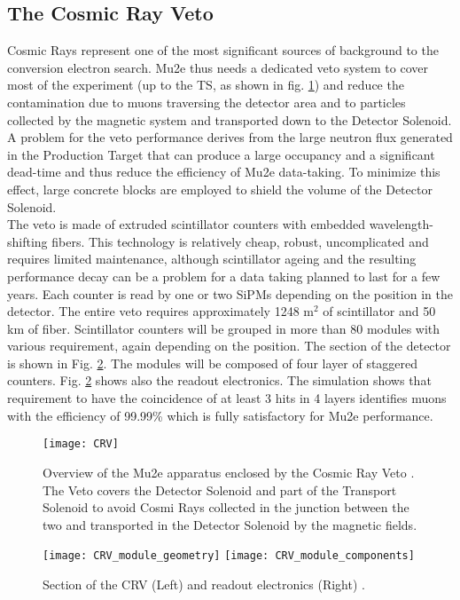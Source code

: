 \documentclass[12pt,a4paper,openright, oneside, titlepage]{book} %
\begin{document}
\subsection{The Cosmic Ray Veto}
Cosmic Rays represent one of the most significant sources of background to the conversion electron search.
Mu2e thus needs a dedicated veto system \cite{CRV:2019} to cover most of the experiment 
(up to the TS, as shown in fig. \ref{_CRV}) and reduce the contamination due to muons traversing the detector area 
and to particles collected by the magnetic system and transported down to the Detector Solenoid. 
A problem for the veto performance derives from the large neutron flux generated 
in the Production Target that can produce a large occupancy and a significant dead-time and thus reduce the efficiency
of Mu2e data-taking. To minimize this effect, large concrete blocks are employed to shield the volume of the Detector Solenoid.\\
The veto is made of extruded scintillator counters with embedded wavelength-shifting fibers.
This technology is relatively cheap, robust, uncomplicated and requires limited maintenance, 
although scintillator ageing and the resulting performance decay can be a problem for a
data taking planned to last for a few years.
Each counter is read by one or two SiPMs depending on the position in the detector. 
The entire veto requires approximately 1248 m$^2$ of scintillator and 50 km of fiber. 
Scintillator counters will be grouped in more than 80 modules with various requirement, 
again depending on the position.
The section of the detector is shown in Fig. \ref{_CRV_module_geometry}.
The modules will be composed of four layer of staggered counters. 
Fig. \ref{_CRV_module_geometry} shows also the readout electronics. 
The simulation shows that requirement to have the coincidence of at least 3 hits in 4 layers
identifies muons with the efficiency of 99.99\% which is fully satisfactory for Mu2e performance.


\begin{figure}[h!]
\centering
\texttt{[image: CRV]}
\caption{Overview of the Mu2e apparatus enclosed by the 
Cosmic Ray Veto \cite{CRV:2019}. 
The Veto covers the Detector Solenoid and part of the 
Transport Solenoid to avoid Cosmi Rays collected in the junction 
between the two and transported in the Detector Solenoid by the magnetic fields.}
\label{_CRV}
\end{figure}

\begin{figure}[h!]
\centering
\texttt{[image: CRV\_module\_geometry]}
\texttt{[image: CRV\_module\_components]}
\caption{Section of the CRV (Left) and readout electronics (Right) \cite{CRV:2019}.}
\label{_CRV_module_geometry}
\end{figure}
\end{document}
